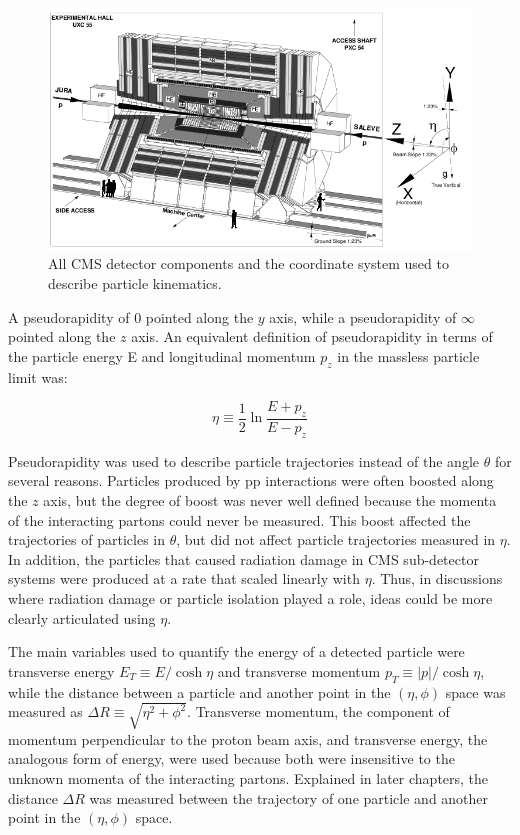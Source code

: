 \begin{figure}[ht]
	\centering
	\includegraphics[width=1\textwidth]{figures/cmsDetectorAndCoordinateSystem.png}
	\caption{All CMS detector components and the coordinate system used to describe particle kinematics.}
	\label{fig:cmsAndCoordinateSystem}
\end{figure}


A pseudorapidity of 0 pointed along the $y$ axis, while a pseudorapidity of $\infty$ pointed along the $z$ axis.
An equivalent definition of pseudorapidity in terms of the particle energy E and longitudinal 
momentum $p_{z}$ in the massless particle limit was:

\begin{equation}
	\eta \equiv \frac{1}{2}\ln{\frac{E+p_{z}}{E-p_{z}}}
\end{equation}

Pseudorapidity was used to describe particle trajectories instead of the angle $\theta$ for several reasons.  Particles 
produced by pp interactions were often boosted along the $z$ axis, but the degree of boost was never well 
defined because the momenta of the interacting partons could never be measured.  This boost affected the 
trajectories of particles in $\theta$, but did not affect particle trajectories measured in $\eta$.  In 
addition, the particles that caused radiation damage in CMS sub-detector systems were produced at 
a rate that scaled linearly with $\eta$.  Thus, in discussions where radiation damage or particle 
isolation played a role, ideas could be more clearly articulated using $\eta$.

The main variables used to quantify the energy of a detected particle were transverse energy 
$E_{T} \equiv E/\cosh{\eta}$ and transverse momentum $p_{T} \equiv |p|/\cosh{\eta}$, while the distance between 
a particle and another point in the $(\eta, \phi)$ space was measured as $\Delta R \equiv \sqrt{\eta^{2} + \phi^{2}}$.  
Transverse momentum, the component of momentum perpendicular to the proton beam axis, and transverse energy, the 
analogous form of energy, were used because both were insensitive to the unknown momenta of the interacting partons.  
Explained in later chapters, the distance $\Delta R$ was measured between the trajectory of one particle 
and another point in the $(\eta, \phi)$ space.

